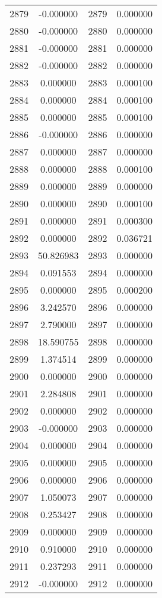 \documentclass[12pt]{article}
\begin{document}
\begin{longtable}{@{}cccc@{}}
2879 & -0.000000 & 2879 & 0.000000 \\
2880 & -0.000000 & 2880 & 0.000000 \\
2881 & -0.000000 & 2881 & 0.000000 \\
2882 & -0.000000 & 2882 & 0.000000 \\
2883 & 0.000000 & 2883 & 0.000100 \\
2884 & 0.000000 & 2884 & 0.000100 \\
2885 & 0.000000 & 2885 & 0.000100 \\
2886 & -0.000000 & 2886 & 0.000000 \\
2887 & 0.000000 & 2887 & 0.000000 \\
2888 & 0.000000 & 2888 & 0.000100 \\
2889 & 0.000000 & 2889 & 0.000000 \\
2890 & 0.000000 & 2890 & 0.000100 \\
2891 & 0.000000 & 2891 & 0.000300 \\
2892 & 0.000000 & 2892 & 0.036721 \\
2893 & 50.826983 & 2893 & 0.000000 \\
2894 & 0.091553 & 2894 & 0.000000 \\
2895 & 0.000000 & 2895 & 0.000200 \\
2896 & 3.242570 & 2896 & 0.000000 \\
2897 & 2.790000 & 2897 & 0.000000 \\
2898 & 18.590755 & 2898 & 0.000000 \\
2899 & 1.374514 & 2899 & 0.000000 \\
2900 & 0.000000 & 2900 & 0.000000 \\
2901 & 2.284808 & 2901 & 0.000000 \\
2902 & 0.000000 & 2902 & 0.000000 \\
2903 & -0.000000 & 2903 & 0.000000 \\
2904 & 0.000000 & 2904 & 0.000000 \\
2905 & 0.000000 & 2905 & 0.000000 \\
2906 & 0.000000 & 2906 & 0.000000 \\
2907 & 1.050073 & 2907 & 0.000000 \\
2908 & 0.253427 & 2908 & 0.000000 \\
2909 & 0.000000 & 2909 & 0.000000 \\
2910 & 0.910000 & 2910 & 0.000000 \\
2911 & 0.237293 & 2911 & 0.000000 \\
2912 & -0.000000 & 2912 & 0.000000 \\

\end{longtable}
\end{document}
